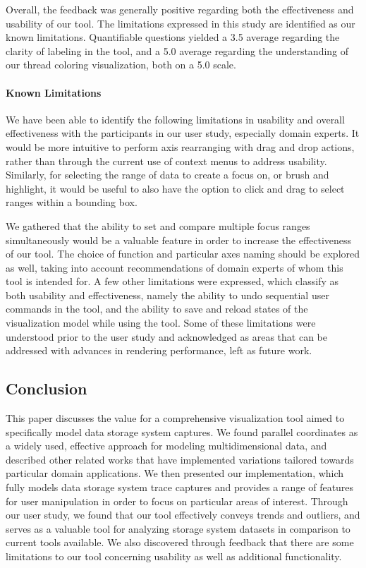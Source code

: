 \documentclass[journal]{vgtc}                %
\begin{document}
Overall, the feedback was generally positive regarding both the effectiveness and usability of our tool. The limitations expressed in this study are identified as our known limitations. Quantifiable questions yielded a 3.5 average regarding the clarity of labeling in the tool, and a 5.0 average regarding the understanding of our thread coloring visualization, both on a 5.0 scale.

\paragraph{Known Limitations}
We have been able to identify the following limitations in usability and overall effectiveness with the participants in our user study, especially domain experts. It would be more intuitive to perform axis rearranging with drag and drop actions, rather than through the current use of context menus to address usability. Similarly, for selecting the range of data to create a focus on, or brush and highlight, it would be useful to also have the option to click and drag to select ranges within a bounding box.

We gathered that the ability to set and compare multiple focus ranges simultaneously would be a valuable feature in order to increase the effectiveness of our tool. The choice of function and particular axes naming should be explored as well, taking into account recommendations of domain experts of whom this tool is intended for. A few other limitations were expressed, which classify as both usability and effectiveness, namely the ability to undo sequential user commands in the tool, and the ability to save and reload states of the visualization model while using the tool. Some of these limitations were understood prior to the user study and acknowledged as areas that can be addressed with advances in rendering performance, left as future work. 

\subsection{Conclusion}
This paper discusses the value for a comprehensive visualization tool aimed to specifically model data storage system captures. We found parallel coordinates as a widely used, effective approach for modeling multidimensional data, and described other related works that have implemented variations tailored towards particular domain applications. We then presented our implementation, which fully models data storage system trace captures and provides a range of features for user manipulation in order to focus on particular areas of interest. Through our user study, we found that our tool effectively conveys trends and outliers, and serves as a valuable tool for analyzing storage system datasets in comparison to current tools available. We also discovered through feedback that there are some limitations to our tool concerning usability as well as additional functionality.
\end{document}
